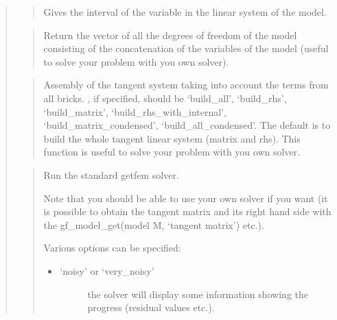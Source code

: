 \documentclass[a4paper,11pt,english]{sphinxmanual}
\begin{document}
\begin{quote}
\sphinxAtStartPar
{}
\begin{quote}

\sphinxAtStartPar
Gives the interval of the variable  in the linear system of
the model.
\end{quote}

\sphinxAtStartPar
{}
\begin{quote}

\sphinxAtStartPar
Return the vector of all the degrees of freedom of the model consisting
of the concatenation of the variables of the model (useful
to solve your problem with you own solver).
\end{quote}

\sphinxAtStartPar
{}
\begin{quote}

\sphinxAtStartPar
Assembly of the tangent system taking into account the terms
from all bricks. , if specified, should be ‘build\_all’,
‘build\_rhs’, ‘build\_matrix’, ‘build\_rhs\_with\_internal’,
‘build\_matrix\_condensed’, ‘build\_all\_condensed’.
The default is to build the whole tangent linear system (matrix and rhs).
This function is useful to solve your problem with you own solver.
\end{quote}

\sphinxAtStartPar
{}
\begin{quote}

\sphinxAtStartPar
Run the standard getfem solver.

\sphinxAtStartPar
Note that you should be able to use your own solver if you want
(it is possible to obtain the tangent matrix and its right hand
side with the gf\_model\_get(model M, ‘tangent matrix’) etc.).

\sphinxAtStartPar
Various options can be specified:
\begin{itemize}
\item {} \begin{description}
\item[{‘noisy’ or ‘very\_noisy’}] \leavevmode
\sphinxAtStartPar
the solver will display some information showing the progress
(residual values etc.).


\end{description}
\end{itemize}
\end{quote}
\end{quote}
\end{document}
